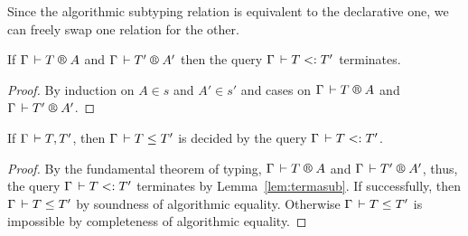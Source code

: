 Since the algorithmic subtyping relation is equivalent to the declarative one, we can freely swap one relation for the other.

\begin{lemma}
  \label{lem:termasub}
  If\/ $\RG \Gamma T A$ and $\RG \Gamma {T'} {A'}$ then the query $\Gamma \,\vdash T \mathrel{{<}{:}} T'$ terminates.
\end{lemma}
\begin{proof}
  By induction on $A \in s$ and $A' \in s'$ and cases on $\RG \Gamma T A$ and $\RG \Gamma {T'} {A'}$.
\end{proof}

\begin{theorem}
  If\/ $\Gamma \,\vdash T,T'$, then $\Gamma \,\vdash T \leq T'$ is decided by the query $\Gamma \,\vdash T \mathrel{{<}{:}} T'$.
\end{theorem}
\begin{proof}
  By the fundamental theorem of typing, $\RG \Gamma T A$ and $\RG \Gamma {T'} {A'}$,
  thus, the query  $\Gamma \,\vdash T \mathrel{{<}{:}} T'$ terminates by Lemma~\ref{lem:termasub}.
  If successfully, then $\Gamma \,\vdash T \leq T'$ by soundness of algorithmic equality.
  Otherwise  $\Gamma \,\vdash T \leq T'$ is impossible by completeness of algorithmic equality.
\end{proof}



